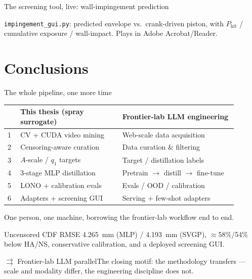 \documentclass[aspectratio=169,11pt]{beamer}
\newcommand{\good}[1]{\textcolor{goodGreen}{#1}}
\newcommand{\blue}[1]{\textcolor{aaltoBlue}{#1}}
\newcommand{\llmparallel}[1]{%
  \begin{block}{$\rightrightarrows$ Frontier-lab LLM parallel}#1\end{block}}
\begin{document}
\begin{frame}{The screening tool, live: wall-impingement prediction}
\centering
{}

{\scriptsize \texttt{impingement\_gui.py}: predicted envelope vs.\ crank-driven piston, with $P_{\mathrm{hit}}$ / cumulative exposure / wall-impact. Plays in Adobe Acrobat/Reader.}
\end{frame}

\section{Conclusions}

\begin{frame}{The whole pipeline, one more time}
\small
\begin{center}
\renewcommand{\arraystretch}{1.02}
\begin{tabular}{L{0.05\linewidth} L{0.40\linewidth} L{0.45\linewidth}}
\toprule
 & \textbf{This thesis (spray surrogate)} & \textbf{\blue{Frontier-lab LLM engineering}} \\
 & CV + CUDA video mining & Web-scale data acquisition \\
2 & Censoring-aware curation & Data curation \& filtering \\
3 & $A$-scale / $q_1$ targets & Target / distillation labels \\
4 & 3-stage MLP distillation & Pretrain $\to$ distill $\to$ fine-tune \\
5 & LONO + calibration evals & Evals / OOD / calibration \\
6 & Adapters + screening GUI & Serving + few-shot adapters \\
\bottomrule
\end{tabular}
\end{center}
\medskip
\begin{center}\blue{One person, one machine, borrowing the frontier-lab workflow end to end.}\end{center}
\medskip
Uncensored CDF RMSE \good{4.265}~mm (MLP) / \good{4.193}~mm (SVGP), \good{$\approx$58\%/54\%}
below HA/NS, conservative calibration, and a deployed screening GUI.
\llmparallel{The closing motif: the \blue{methodology transfers} --- scale and modality
differ, the engineering discipline does not.}
\end{frame}
\end{document}
